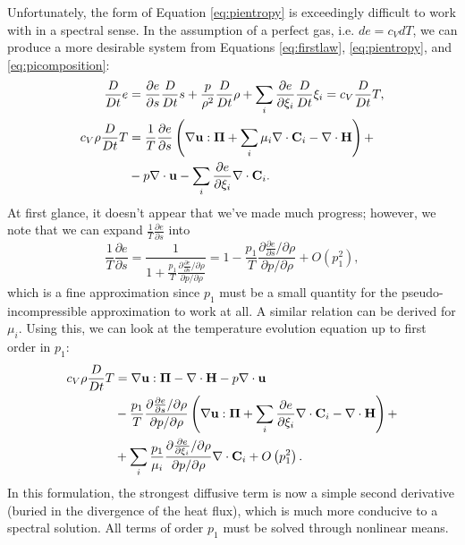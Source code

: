 Unfortunately, the form of Equation \ref{eq:pientropy} is exceedingly difficult to work with in a spectral sense.
In the assumption of a perfect gas, i.e. $de=c_{V}dT$, we can produce a more desirable system from Equations \ref{eq:firstlaw}, \ref{eq:pientropy}, and \ref{eq:picomposition}:
\begin{align}
	\frac{D}{Dt}e&=\frac{\partial e}{\partial s}\frac{D}{Dt}s+\frac{p}{\rho^{2}}\frac{D}{Dt}\rho+\sum_{i}\frac{\partial e}{\partial \xi_{i}}\frac{D}{Dt}\xi_{i}=c_{V}\frac{D}{Dt}T,\\
	c_{V}\rho\frac{D}{Dt}T&=\frac{1}{T}\frac{\partial e}{\partial s}\left(\nabla\mathbf{u}:\mathbf{\Pi}+\sum_{i}\mu_{i}\nabla\cdot\mathbf{C}_{i}-\nabla\cdot{\mathbf{H}}\right)+\nonumber\\
	&-p\nabla\cdot\mathbf{u}-\sum_{i}\frac{\partial e}{\partial \xi_{i}}\nabla\cdot\mathbf{C}_{i}.
\end{align}
At first glance, it doesn't appear that we've made much progress; however, we note that we can expand $\frac{1}{T}\frac{\partial e}{\partial s}$ into
\begin{equation}
	\frac{1}{T}\frac{\partial e}{\partial s}=\frac{1}{1+\frac{p_{1}}{T}\frac{\partial \frac{\partial e}{\partial s}/\partial\rho}{\partial p/\partial\rho}}=1-\frac{p_{1}}{T}\frac{\partial \frac{\partial e}{\partial s}/\partial\rho}{\partial p/\partial\rho}+O\left(p_{1}^{2}\right),
\end{equation}
which is a fine approximation since $p_1$ must be a small quantity for the pseudo-incompressible approximation to work at all.
A similar relation can be derived for $\mu_{i}$.
Using this, we can look at the temperature evolution equation up to first order in $p_{1}$:
\begin{align}
	c_{V}\rho\frac{D}{Dt}T&=\nabla\mathbf{u}:\mathbf{\Pi}-\nabla\cdot{\mathbf{H}}-p\nabla\cdot\mathbf{u}\nonumber\\
	&-\frac{p_{1}}{T}\frac{\partial \frac{\partial e}{\partial s}/\partial\rho}{\partial p/\partial\rho}\left(\nabla\mathbf{u}:\mathbf{\Pi}+\sum_{i}\frac{\partial e}{\partial \xi_{i}}\nabla\cdot\mathbf{C}_{i}-\nabla\cdot{\mathbf{H}}\right)+\nonumber\\
	&+\sum_{i}\frac{p_{1}}{\mu_{i}}\frac{\partial \frac{\partial e}{\partial \xi_{i}}/\partial\rho}{\partial p/\partial\rho}\nabla\cdot\mathbf{C}_{i}+O\left(p_{1}^{2}\right).
\end{align}
In this formulation, the strongest diffusive term is now a simple second derivative (buried in the divergence of the heat flux), which is much more conducive to a spectral solution.
All terms of order $p_{1}$ must be solved through nonlinear means.



